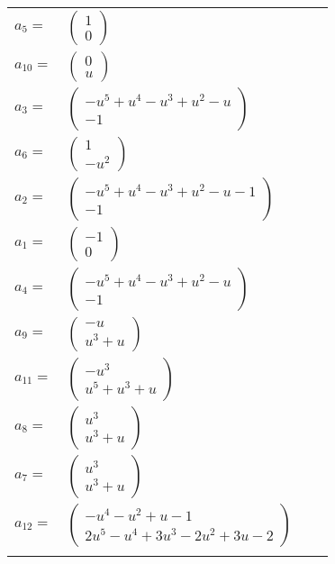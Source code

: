 \documentclass[1p]{elsarticle_modified}
\theoremstyle{definition}
\begin{document}
\begin{tabular}{m{7pt} m{180pt} m{7pt} m{180pt} }
\flushright $a_{5}=$&$\begin{pmatrix}1\\0\end{pmatrix}$ \\
\flushright $a_{10}=$&$\begin{pmatrix}0\\u\end{pmatrix}$ \\
\flushright $a_{3}=$&$\begin{pmatrix}- u^5+u^4- u^3+u^2- u\\-1\end{pmatrix}$ \\
\flushright $a_{6}=$&$\begin{pmatrix}1\\- u^2\end{pmatrix}$ \\
\flushright $a_{2}=$&$\begin{pmatrix}- u^5+u^4- u^3+u^2- u-1\\-1\end{pmatrix}$ \\
\flushright $a_{1}=$&$\begin{pmatrix}-1\\0\end{pmatrix}$ \\
\flushright $a_{4}=$&$\begin{pmatrix}- u^5+u^4- u^3+u^2- u\\-1\end{pmatrix}$ \\
\flushright $a_{9}=$&$\begin{pmatrix}- u\\u^3+u\end{pmatrix}$ \\
\flushright $a_{11}=$&$\begin{pmatrix}- u^3\\u^5+u^3+u\end{pmatrix}$ \\
\flushright $a_{8}=$&$\begin{pmatrix}u^3\\u^3+u\end{pmatrix}$ \\
\flushright $a_{7}=$&$\begin{pmatrix}u^3\\u^3+u\end{pmatrix}$ \\
\flushright $a_{12}=$&$\begin{pmatrix}- u^4- u^2+u-1\\2 u^5- u^4+3 u^3-2 u^2+3 u-2\end{pmatrix}$\\&\end{tabular}
\end{document}
